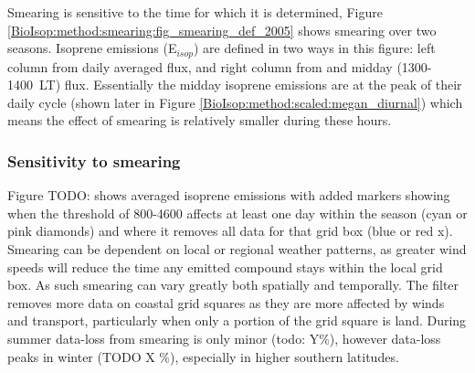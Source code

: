       Smearing is sensitive to the time for which it is determined, Figure \ref{BioIsop:method:smearing:fig_smearing_def_2005} shows smearing over two seasons.
      Isoprene emissions (E$_{isop}$) are defined in two ways in this figure: left column from daily averaged flux, and right column from and midday (1300-1400~LT) flux. 
      Essentially the midday isoprene emissions are at the peak of their daily cycle (shown later in Figure \ref{BioIsop:method:scaled:megan_diurnal}) which means the effect of smearing is relatively smaller during these hours.
      
      
      
      
    
      
    \subsubsection{Sensitivity to smearing}
    
      
      Figure TODO: shows averaged isoprene emissions with added markers showing when the threshold of 800-4600 affects at least one day within the season (cyan or pink diamonds) and where it removes all data for that grid box (blue or red x).
      Smearing can be dependent on local or regional weather patterns, as greater wind speeds will reduce the time any emitted compound stays within the local grid box.
      As such smearing can vary greatly both spatially and temporally.
      The filter removes more data on coastal grid squares as they are more affected by winds and transport, particularly when only a portion of the grid square is land.
      During summer data-loss from smearing is only minor (todo: Y\%), however data-loss peaks in winter (TODO X \%), especially in higher southern latitudes.
      
